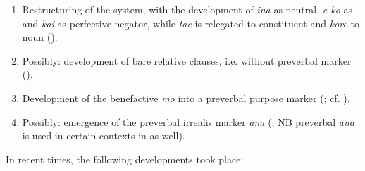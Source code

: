 \begin{enumerate}
\item 
Restructuring of the  system, with the development of \textit{{\ꞌ}ina} as neutral, \textit{e ko} as  and \textit{kai} as perfective negator, while \textit{ta{\ꞌ}e} is relegated to constituent  and \textit{kore} to noun  ().

\largerpage
\item 
Possibly: development of bare relative clauses, i.e. without preverbal marker\\ ().

\item 
Development of the benefactive  \textit{mo} into a preverbal purpose marker (; cf. \citealt[27]{FinneyAlexander1998}).

\item 
Possibly: emergence of the preverbal irrealis marker \textit{ana} (; NB preverbal \textit{ana} is used in certain contexts in  as well).

\end{enumerate}

\newpage 
In recent times, the following developments took place:

